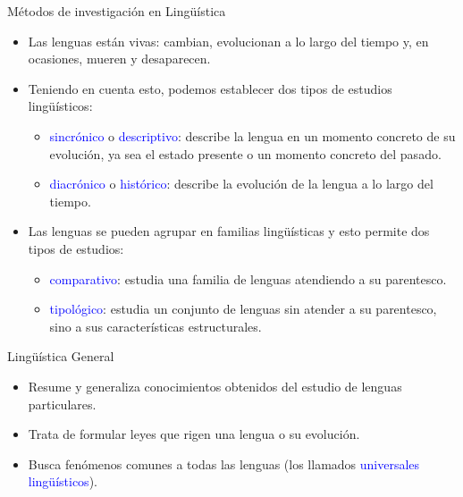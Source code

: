 \documentclass[handout]{beamer}
\begin{document}
\begin{frame}{Métodos de investigación en Lingüística}

\begin{itemize}
	\item Las lenguas están vivas: cambian, evolucionan a lo largo del tiempo y, en ocasiones, mueren y desaparecen.
	\item Teniendo en cuenta esto, podemos establecer dos tipos de estudios lingüísticos:
	\begin{itemize}
		\item \textcolor{blue}{sincrónico} o \textcolor{blue}{descriptivo}: describe la lengua en un momento concreto de su evolución, ya sea el estado presente o un momento concreto del pasado.
		\item \textcolor{blue}{diacrónico} o \textcolor{blue}{histórico}: describe la evolución de la lengua a lo largo del tiempo.
	\end{itemize}
	\item Las lenguas se pueden agrupar en familias lingüísticas y esto permite dos tipos de estudios:
	\begin{itemize}
		\item \textcolor{blue}{comparativo}: estudia una familia de lenguas atendiendo a su parentesco.
		\item \textcolor{blue}{tipológico}: estudia un conjunto de lenguas sin atender a su parentesco, sino a sus características estructurales.
	\end{itemize}
	
	
\end{itemize}


\end{frame}

\begin{frame}{Lingüística General}

\begin{itemize}
	\item Resume y generaliza conocimientos obtenidos del estudio de lenguas particulares.
	\item Trata de formular leyes que rigen una lengua o su evolución.
	\item Busca fenómenos comunes a todas las lenguas (los llamados \textcolor{blue}{universales lingüísticos}).
\end{itemize}
\end{frame}
\end{document}
